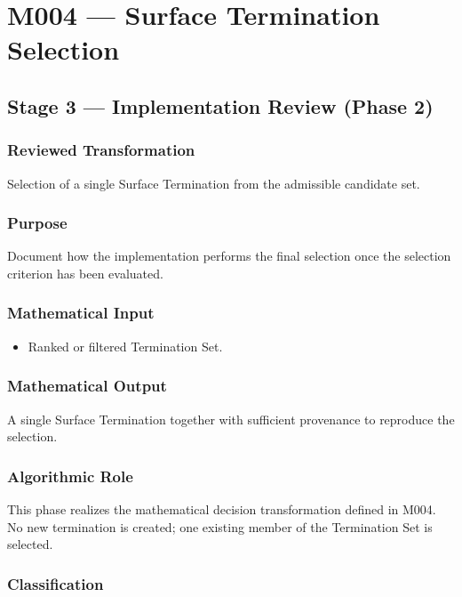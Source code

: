 \chapter{M004 --- Surface Termination Selection}

\section{Stage 3 --- Implementation Review (Phase 2)}

\subsection{Reviewed Transformation}

Selection of a single Surface Termination from the admissible candidate
set.

\subsection{Purpose}

Document how the implementation performs the final selection once the
selection criterion has been evaluated.

\subsection{Mathematical Input}

\begin{itemize}
\item Ranked or filtered Termination Set.
\end{itemize}

\subsection{Mathematical Output}

A single Surface Termination together with sufficient provenance to
reproduce the selection.

\subsection{Algorithmic Role}

This phase realizes the mathematical decision transformation defined in
M004. No new termination is created; one existing member of the
Termination Set is selected.

\subsection{Classification}

